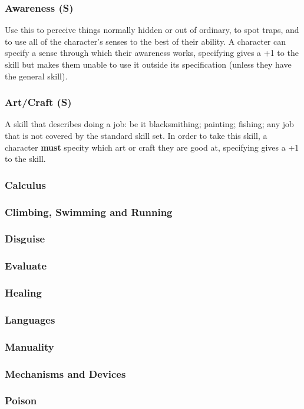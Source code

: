\subsubsection*{Awareness (S)}
Use this to perceive things normally hidden or out of ordinary, to spot traps, and to use all of the character's senses to the best of their ability. A character can specify a sense through which their awareness works, specifying gives a +1 to the skill but makes them unable to use it outside its specification (unless they have the general skill).
\subsubsection*{Art/Craft (S)}
A skill that describes doing a job: be it blacksmithing; painting; fishing; any job that is not covered by the standard skill set. In order to take this skill, a character \textbf{must} specity which art or craft they are good at, specifying gives a +1 to the skill.
\subsubsection*{Calculus}
\subsubsection*{Climbing, Swimming and Running}
\subsubsection*{Disguise}
\subsubsection*{Evaluate}
\subsubsection*{Healing}
\subsubsection*{Languages}
\subsubsection*{Manuality}
\subsubsection*{Mechanisms and Devices}
\subsubsection*{Poison}
